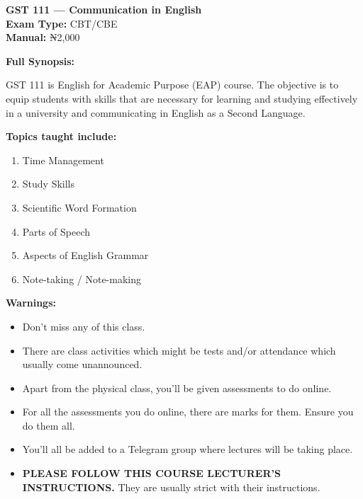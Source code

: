 \documentclass[11pt,a4paper]{article}
\begin{document}
\begin{coursebox}
    \textbf{\color{primary}\Large GST 111 --- Communication in English}\\
    \textbf{Exam Type:} CBT/CBE \\
    \textbf{Manual:} ₦2,000

    \vspace{0.8em}

    \textbf{Full Synopsis:}

    GST 111 is English for Academic Purpose (EAP) course. The objective is to equip students with skills that are necessary for learning and studying effectively in a university and communicating in English as a Second Language.

    \textbf{Topics taught include:}
    \begin{enumerate}[leftmargin=1.5em, itemsep=0.2em]
        \item Time Management
        \item Study Skills
        \item Scientific Word Formation
        \item Parts of Speech
        \item Aspects of English Grammar
        \item Note-taking / Note-making
    \end{enumerate}

    \vspace{0.8em}

    \textbf{\color{warningText}Warnings:}
    \begin{itemize}[leftmargin=1.5em, itemsep=0.2em]
        \item Don't miss any of this class.
        \item There are class activities which might be tests and/or attendance which usually come unannounced.
        \item Apart from the physical class, you'll be given assessments to do online.
        \item For all the assessments you do online, there are marks for them. Ensure you do them all.
        \item You'll all be added to a Telegram group where lectures will be taking place.
        \item \textbf{PLEASE FOLLOW THIS COURSE LECTURER'S INSTRUCTIONS.} They are usually strict with their instructions.
    \end{itemize}
\end{coursebox}
\end{document}
